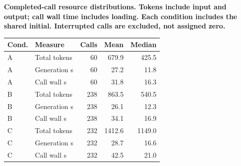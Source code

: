 \begin{center}
\textbf{Completed-call resource distributions. Tokens include input and output; call wall time includes loading. Each condition includes the shared initial. Interrupted calls are excluded, not assigned zero.}\par\vspace{3pt}
\small
\begin{tabular}{llrrr}
\toprule
Cond. & Measure & Calls & Mean & Median \\
\midrule
A & Total tokens & 60 & 679.9 & 425.5 \\
A & Generation s & 60 & 27.2 & 11.8 \\
A & Call wall s & 60 & 31.8 & 16.3 \\
B & Total tokens & 238 & 863.5 & 540.5 \\
B & Generation s & 238 & 26.1 & 12.3 \\
B & Call wall s & 238 & 34.1 & 16.9 \\
C & Total tokens & 232 & 1412.6 & 1149.0 \\
C & Generation s & 232 & 28.7 & 16.6 \\
C & Call wall s & 232 & 42.5 & 21.0 \\
\bottomrule
\end{tabular}
\end{center}
